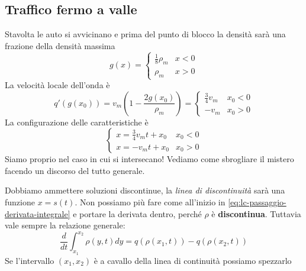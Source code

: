 \documentclass[10pt,a4paper,twoside,openright]{book}
\begin{document}
\subsection{Traffico fermo a valle}

Stavolta le auto si avvicinano e prima del punto di blocco la densità sarà una frazione della densità massima
\begin{equation*}
	g( x) =
	\begin{cases}
		\frac{1}{8} \rho _{m} & x< 0 \\
		\rho _{m}             & x >0 
	\end{cases}
\end{equation*}
La velocità locale dell'onda è
\begin{equation*}
	q'( g( x_{0})) =v_{m}\left( 1-\frac{2g(x_{0})}{\rho _{m}}\right) =
	\begin{cases}
		\frac{3}{4} v_{m} & x_{0} < 0 \\
		-v_{m}            & x_{0}  >0 
	\end{cases}
\end{equation*}
La configurazione delle caratteristiche è
\begin{equation*}
	\begin{cases}
		x=\frac{3}{4} v_{m} t+x_{0} & x_{0} < 0 \\
		x=-v_{m} t+x_{0}            & x_{0}  >0 
	\end{cases}
\end{equation*}
Siamo proprio nel caso in cui si intersecano! Vediamo come sbrogliare il mistero facendo un discorso del tutto generale.


Dobbiamo ammettere soluzioni discontinue, la \textit{linea di discontinuità} sarà una funzione $x=s( t)$. Non possiamo più fare come all'inizio in \eqref{eq:lc-passaggio-derivata-integrale} e portare la derivata dentro, perché $\rho $ è \textbf{discontinua}. Tuttavia vale sempre la relazione generale:
\begin{equation*}
	\frac{d}{dt}\int ^{x_{2}}_{x_{1}} \rho ( y,t) dy=q( \rho ( x_{1} ,t)) -q( \rho ( x_{2} ,t))
\end{equation*}
Se l'intervallo $( x_{1} ,x_{2})$ è a cavallo della linea di continuità possiamo spezzarlo
\end{document}
